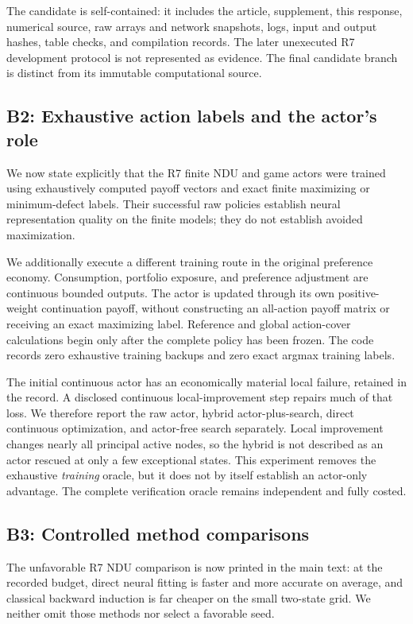The candidate is self-contained: it includes the article, supplement, this response, numerical source, raw arrays and network snapshots, logs, input and output hashes, table checks, and compilation records. The later unexecuted R7 development protocol is not represented as evidence. The final candidate branch is distinct from its immutable computational source.

\subsection{B2: Exhaustive action labels and the actor's role}
We now state explicitly that the R7 finite NDU and game actors were trained using exhaustively computed payoff vectors and exact finite maximizing or minimum-defect labels. Their successful raw policies establish neural representation quality on the finite models; they do not establish avoided maximization.

We additionally execute a different training route in the original preference economy. Consumption, portfolio exposure, and preference adjustment are continuous bounded outputs. The actor is updated through its own positive-weight continuation payoff, without constructing an all-action payoff matrix or receiving an exact maximizing label. Reference and global action-cover calculations begin only after the complete policy has been frozen. The code records zero exhaustive training backups and zero exact argmax training labels.

The initial continuous actor has an economically material local failure, retained in the record. A disclosed continuous local-improvement step repairs much of that loss. We therefore report the raw actor, hybrid actor-plus-search, direct continuous optimization, and actor-free search separately. Local improvement changes nearly all principal active nodes, so the hybrid is not described as an actor rescued at only a few exceptional states. This experiment removes the exhaustive \emph{training} oracle, but it does not by itself establish an actor-only advantage. The complete verification oracle remains independent and fully costed.

\subsection{B3: Controlled method comparisons}
The unfavorable R7 NDU comparison is now printed in the main text: at the recorded budget, direct neural fitting is faster and more accurate on average, and classical backward induction is far cheaper on the small two-state grid. We neither omit those methods nor select a favorable seed.

